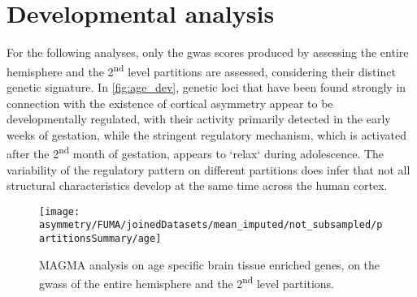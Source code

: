 \section{Developmental analysis}
For the following analyses, only the \ac{gwas} scores produced by assessing the entire hemisphere and the 2\textsuperscript{nd} level partitions are assessed, considering their distinct genetic signature. In \autoref{fig:age_dev}, genetic loci that have been found strongly in connection with the existence of cortical asymmetry appear to be developmentally regulated, with their activity primarily detected in the early weeks of gestation, while the stringent regulatory mechanism, which is activated after the 2\textsuperscript{nd} month of gestation, appears to `relax` during adolescence. The variability of the regulatory pattern on different partitions does infer that not all structural characteristics develop at the same time across the human cortex.

\begin{figure}[H]
	\begin{adjustwidth}{-3cm}{-3cm}
	\centering
	\texttt{[image: asymmetry/FUMA/joinedDatasets/mean\_imputed/not\_subsampled/partitionsSummary/age]}
	\caption[Brain tissue specific age enriched genes analysis]{MAGMA analysis on age specific brain tissue enriched genes, on the \acp{gwas} of the entire hemisphere and the 2\textsuperscript{nd} level partitions.}
	\label{fig:age_dev}
	\end{adjustwidth}
\end{figure}


